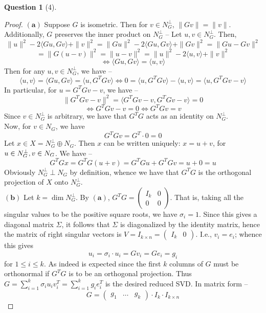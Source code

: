 \documentclass[11pt]{article}
\theoremstyle{quest}
\newtheorem*{question}{Question}
\begin{document}
\begin{question}[4]
\end{question}
\begin{proof}
$\mathbf{(a)}$ Suppose $G$ is isometric. Then for $v \in N_G^{\perp}$, $\|G v \| = \|v\|$. Additionally, $G$ preserves the inner product on $N_G^{\perp}$ -- Let $u,v \in N_G^{\perp}$. Then,
$$\|u\|^2 -2 \langle Gu, Gv \rangle + \|v\|^2 = \|Gu\|^2 -2 \langle Gu, Gv \rangle + \|Gv\|^2 = \|Gu - Gv \|^2$$
$$= \|G (u-v)\|^2 = \|u - v\|^2  = \|u\|^2 -2 \langle u, v \rangle + \|v\|^2$$
$$\iff \langle Gu, Gv \rangle = \langle u, v \rangle$$
Then for any $u, v \in N_G^{\perp}$, we have --
$$\langle u, v \rangle = \langle Gu, Gv \rangle = \langle u, G^TG v \rangle \iff 0 = \langle u, G^TGv \rangle - \langle u, v \rangle  = \langle u, G^TGv - v \rangle $$
In particular, for $u = G^TG v - v$, we have --
$$\|G^TGv - v\|^2 = \langle G^TGv - v, G^TGv - v \rangle  = 0$$
$$\iff G^TGv - v = 0 \iff G^TGv = v$$
Since $v \in N_G^{\perp}$ is arbitrary, we have that $G^TG$ acts as an identity on $N_G^{\perp}$.
\\Now, for $v \in N_G$, we have
$$G^TGv= G^T \cdot 0 = 0$$
Let $x \in X = N_G^{\perp} \oplus N_G$. Then $x$ can be written uniquely: $x = u +v$, for $u \in N_G^{\perp},\\ v \in N_G$. We have --
$$G^TGx = G^TG(u+v) = G^TGu + G^TGv = u + 0 = u$$
Obviously $N_G^{\perp} \perp N_G$ by definition, whence we have that $G^TG$ is the orthogonal projection of $X$ onto $N_G^{\perp}$.
\\$\mathbf{(b)}$ Let $k = \dim N_G^{\perp}$. By $\mathbf{(a)}$, $G^TG = \begin{pmatrix}
I_k & 0 \\
0 & 0
\end{pmatrix} $. That is, taking all the singular values to be the positive square roots, we have $\sigma_i  = 1$. Since this gives a diagonal matrix $\Sigma$, it follows that $\Sigma$ is diagonalized by the identity matrix, hence the matrix of right singular vectors is $V = I_{k \times n} = \begin{pmatrix}
I_k & 0
\end{pmatrix}$. I.e., $v_i = e_i$; whence this gives
$$u_i = \sigma_i \cdot u_i = G v_i = G e_i = g_i$$
for $1 \le i \le k$. As indeed is expected since the first $k$ columns of $G$ must be orthonormal if $G^TG$ is to be an orthogonal projection. Thus $G = \sum_{i=1}^k \sigma_i u_i v_i^T = \sum_{i=1}^k g_i e_i^T$ is the desired reduced SVD. In matrix form --
$$G = \begin{pmatrix}
g_1 & \ldots & g_k
\end{pmatrix} \cdot I_k \cdot I_{k \times n}$$
\end{proof}
\end{document}
